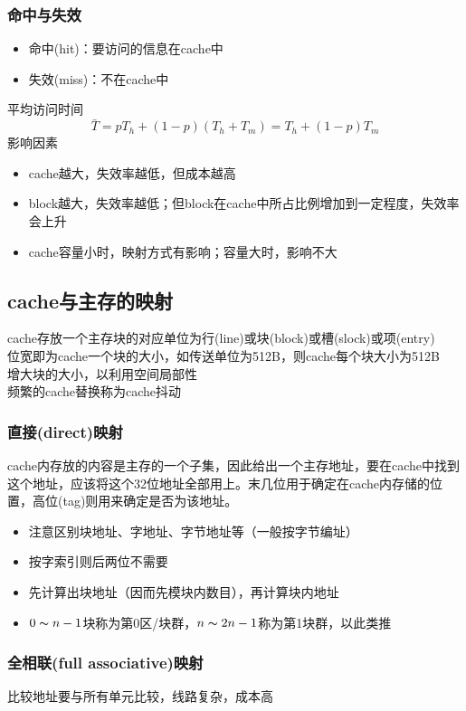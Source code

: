 \subsubsection{命中与失效}
\begin{itemize}
	\item 命中(hit)：要访问的信息在cache中
	\item 失效(miss)：不在cache中
\end{itemize}
平均访问时间
\[\bar{T}=pT_h+(1-p)(T_h+T_m)=T_h+(1-p)T_m\]
影响因素
\begin{itemize}
	\item cache越大，失效率越低，但成本越高
	\item block越大，失效率越低；但block在cache中所占比例增加到一定程度，失效率会上升
	\item cache容量小时，映射方式有影响；容量大时，影响不大
\end{itemize}

\subsection{cache与主存的映射}
cache存放一个主存块的对应单位为行(line)或块(block)或槽(slock)或项(entry)\\
位宽即为cache一个块的大小，如传送单位为512B，则cache每个块大小为512B\\
增大块的大小，以利用空间局部性\\
频繁的cache替换称为cache抖动

\subsubsection{直接(direct)映射}
cache内存放的内容是主存的一个子集，因此给出一个主存地址，要在cache中找到这个地址，应该将这个32位地址全部用上。末几位用于确定在cache内存储的位置，高位(tag)则用来确定是否为该地址。
\begin{itemize}
	\item 注意区别块地址、字地址、字节地址等（一般按字节编址）
	\item 按字索引则后两位不需要
	\item 先计算出块地址（因而先模块内数目），再计算块内地址
	\item $0\thicksim n-1$块称为第0区/块群，$n\thicksim 2n-1$称为第1块群，以此类推
\end{itemize}

\subsubsection{全相联(full associative)映射}
比较地址要与所有单元比较，线路复杂，成本高

